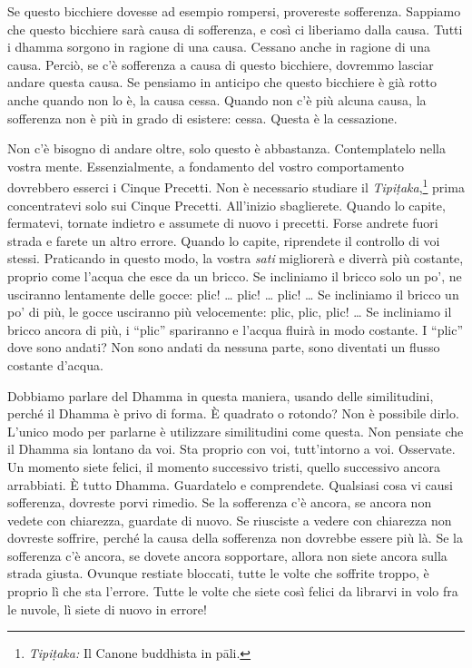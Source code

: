 Se questo bicchiere dovesse ad esempio rompersi, provereste sofferenza.
Sappiamo che questo bicchiere sarà causa di sofferenza, e così ci
liberiamo dalla causa. Tutti i dhamma sorgono in ragione di una
causa. Cessano anche in ragione di una causa. Perciò, se c'è sofferenza
a causa di questo bicchiere, dovremmo lasciar andare questa causa. Se
pensiamo in anticipo che questo bicchiere è già rotto anche quando non
lo è, la causa cessa. Quando non c'è più alcuna causa, la sofferenza non
è più in grado di esistere: cessa. Questa è la cessazione.

Non c'è bisogno di andare oltre, solo questo è abbastanza. Contemplatelo
nella vostra mente. Essenzialmente, a fondamento del vostro
comportamento dovrebbero esserci i Cinque Precetti. Non è necessario
studiare il \emph{Tipiṭaka},\footnote{\emph{Tipiṭaka:} Il Canone
  buddhista in pāli.} prima concentratevi solo sui Cinque Precetti.
All'inizio sbaglierete. Quando lo capite, fermatevi, tornate indietro e
assumete di nuovo i precetti. Forse andrete fuori strada e farete un
altro errore. Quando lo capite, riprendete il controllo di voi stessi.
Praticando in questo modo, la vostra \emph{sati} migliorerà e diverrà
più costante, proprio come l'acqua che esce da un bricco. Se incliniamo
il bricco solo un po', ne usciranno lentamente delle gocce: plic! \ldots{}
plic! \ldots{} plic! \ldots{} Se incliniamo il bricco un po' di più, le gocce
usciranno più velocemente: plic, plic, plic! \ldots{} Se incliniamo il bricco
ancora di più, i ``plic'' spariranno e l'acqua fluirà in modo costante.
I ``plic'' dove sono andati? Non sono andati da nessuna parte, sono
diventati un flusso costante d'acqua.

Dobbiamo parlare del Dhamma in questa maniera, usando delle
similitudini, perché il Dhamma è privo di forma. È quadrato o rotondo?
Non è possibile dirlo. L'unico modo per parlarne è utilizzare
similitudini come questa. Non pensiate che il Dhamma sia lontano da voi.
Sta proprio con voi, tutt'intorno a voi. Osservate. Un momento siete
felici, il momento successivo tristi, quello successivo ancora
arrabbiati. È tutto Dhamma. Guardatelo e comprendete. Qualsiasi cosa vi
causi sofferenza, dovreste porvi rimedio. Se la sofferenza c'è ancora,
se ancora non vedete con chiarezza, guardate di nuovo. Se riusciste a
vedere con chiarezza non dovreste soffrire, perché la causa della
sofferenza non dovrebbe essere più là. Se la sofferenza c'è ancora, se
dovete ancora sopportare, allora non siete ancora sulla strada giusta.
Ovunque restiate bloccati, tutte le volte che soffrite troppo, è proprio
lì che sta l'errore. Tutte le volte che siete così felici da librarvi in
volo fra le nuvole, lì siete di nuovo in errore!


